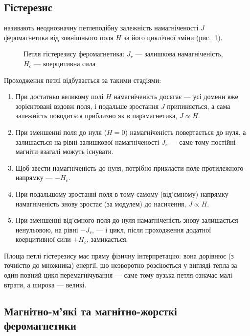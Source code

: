 \subsection*{Гістерезис}

 називають неоднозначну петлеподібну залежність намагніченості $J$ феромагнетика від зовнішнього поля $H$ за його циклічної
зміни (рис.~\ref{pic:Hysteresis}).

\begin{figure}\centering
	\caption{Петля гістерезису феромагнетика: $J_r$ --- залишкова намагніченість, $H_c$ ---
		коерцитивна сила\label{pic:Hysteresis}}
\end{figure}

Проходження петлі відбувається за такими стадіями:
\begin{enumerate}
	\item При достатньо великому полі $H$ намагніченість досягає  --- усі домени вже зорієнтовані вздовж поля, і подальше
	      зростання $J$ припиняється, а сама залежність поводиться приблизно як в парамагнетика, $J\propto H$.
	\item При зменшенні поля до нуля ($H=0$) намагніченість  повертається до нуля, а залишається на рівні залишкової намагніченості
	      $J_r$ --- саме тому постійні магніти взагалі можуть існувати.
	\item Щоб звести намагніченість до нуля, потрібно прикласти поле протилежного напрямку ---  $-H_c$.
	\item При подальшому зростанні поля в тому самому (від'ємному) напрямку намагніченість знову зростає (за модулем) до насичення, $J\propto H$.
	\item При зменшенні від'ємного поля до нуля намагніченість знову залишається ненульовою, на рівні $-J_r$, --- і цикл, після проходження
	      додатної коерцитивної сили $+H_c$, замикається.
\end{enumerate}

\begin{Attention}
	Площа петлі гістерезису має пряму фізичну інтерпретацію: вона дорівнює (з точністю до множника) енергії, що незворотно розсіюється у вигляді
	тепла за один повний цикл перемагнічування --- саме тому вузька петля означає малі втрати, а широка --- великі.
\end{Attention}

\subsection*{Магнітно-м'які та магнітно-жорсткі феромагнетики}


